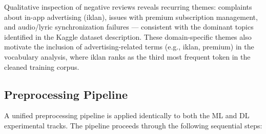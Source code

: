 \documentclass{article}
\begin{document}
Qualitative inspection of negative reviews reveals recurring themes: complaints about in-app advertising (iklan), issues with premium subscription management, and audio/lyric synchronization failures --- consistent with the dominant topics identified in the Kaggle dataset description. These domain-specific themes also motivate the inclusion of advertising-related terms (e.g., iklan, premium) in the vocabulary analysis, where iklan ranks as the third most frequent token in the cleaned training corpus.

\subsection{Preprocessing Pipeline}
A unified preprocessing pipeline is applied identically to both the ML and DL experimental tracks. The pipeline proceeds through the following sequential steps:
\end{document}
